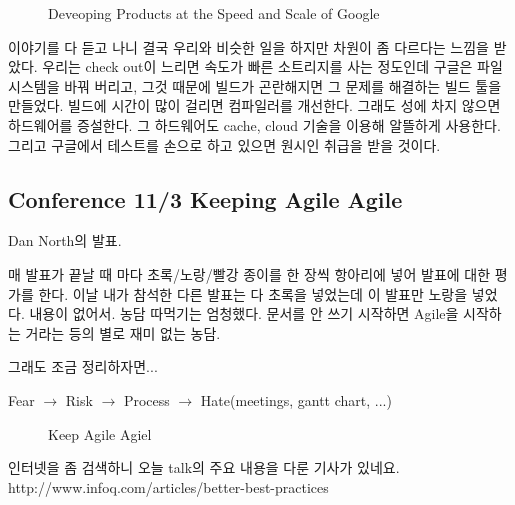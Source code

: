 \documentclass[a4paper]{article}
\begin{document}
\begin{figure}[t]
    \begin{Frame}
        \begin{center}
        \end{center}
    \end{Frame}
    \caption{Deveoping Products at the Speed and Scale of Google}
    \label{google}
\end{figure}
 
이야기를 다 듣고 나니 결국 우리와 비슷한 일을 하지만 차원이 좀 다르다는
느낌을 받았다. 우리는 check out이 느리면 속도가 빠른 소트리지를 사는
정도인데 구글은 파일시스템을 바꿔 버리고, 그것 때문에 빌드가 곤란해지면
그 문제를 해결하는 빌드 툴을 만들었다. 빌드에 시간이 많이 걸리면
컴파일러를 개선한다. 그래도 성에 차지 않으면 하드웨어를 증설한다. 그
하드웨어도 cache, cloud 기술을 이용해 알뜰하게 사용한다. 그리고
구글에서 테스트를 손으로 하고 있으면 원시인 취급을 받을 것이다.

\subsection{Conference 11/3 Keeping Agile Agile}
 
Dan North의 발표.  

매 발표가 끝날 때 마다 초록/노랑/빨강 종이를 한 장씩 항아리에 넣어
발표에 대한 평가를 한다.  이날 내가 참석한 다른 발표는 다 초록을
넣었는데 이 발표만 노랑을 넣었다.  내용이 없어서. 농담 따먹기는 엄청했다. 
문서를 안 쓰기 시작하면 Agile을 시작하는 거라는 등의 별로 재미 없는 농담.
 
그래도 조금 정리하자면...

\begin{center}
Fear $\rightarrow$ Risk $\rightarrow$ Process $\rightarrow$ Hate(meetings, gantt chart, ...)
\end{center}

\begin{figure}[t]
    \begin{Frame}
        \begin{center}
        \end{center}
    \end{Frame}
    \caption{Keep Agile Agiel}
    \label{agile agile}
\end{figure}

인터넷을 좀 검색하니 오늘 talk의 주요 내용을 다룬 기사가 있네요.
http://www.infoq.com/articles/better-best-practices
 
\end{document}
